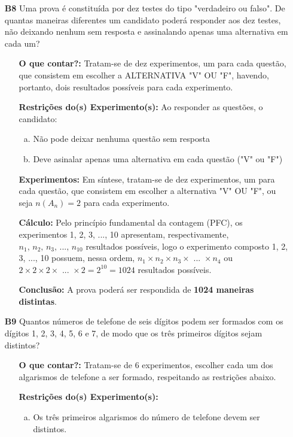 \documentclass[a4paper,12pt]{article}
\begin{document}
\begin{enumerate}
\item[\textbf{B8}] Uma prova é constituída por dez testes do tipo "verdadeiro ou falso". De quantas maneiras diferentes um candidato poderá responder aos dez testes, não deixando nenhum sem resposta e assinalando apenas uma alternativa em cada um?
  \begin{itemize}
    \item[\ding{172}] \textbf{O que contar?:} Tratam-se de dez experimentos, um para cada questão, que consistem em escolher a ALTERNATIVA "V" OU "F", havendo, portanto, dois resultados possíveis para cada experimento.
    \item[\ding{173}] \textbf{Restrições do(s) Experimento(s):} Ao responder as questões, o candidato:
        \begin{enumerate}[a)]
          \item Não pode deixar nenhuma questão sem resposta
          \item Deve asinalar apenas uma alternativa em cada questão ("V" ou "F")
        \end{enumerate}     
    \item[\ding{174}] \textbf{Experimentos:} Em síntese, tratam-se de dez experimentos, um para cada questão, que consistem em escolher a alternativa "V" OU "F", ou seja $n(A_n) = 2$ para cada experimento.
    \item[\ding{175}] \textbf{Cálculo:} Pelo princípio fundamental da contagem (PFC), os experimentos 1, 2, 3, ..., 10 apresentam, respectivamente, $n_{1},\, n_{2},\, n_{3} \textrm{, ..., } n_{10}$ resultados possíveis, logo o experimento composto 1, 2, 3, ..., 10 possuem, nessa ordem, $n_{1} \times n_{2} \times n_{3} \times \textrm{ ... } \times n_{4}$ ou $2 \times 2 \times 2  \times \textrm{ ... }  \times 2 = 2^{10} = 1024$ resultados possíveis. 
    \item[\ding{176}] \textbf{Conclusão:} A prova poderá ser respondida de \textbf{1024 maneiras distintas}.  
  \end{itemize}

\item[\textbf{B9}] Quantos números de telefone de seis dígitos podem ser formados com os dígitos 1, 2, 3, 4, 5, 6 e 7, de modo que os três primeiros dígitos sejam distintos?
  \begin{itemize}
    \item[\ding{172}] \textbf{O que contar?:} Tratam-se de 6 experimentos, escolher cada um dos algarismos de telefone a ser formado, respeitando as restrições abaixo.
    \item[\ding{173}] \textbf{Restrições do(s) Experimento(s):}
        \begin{enumerate}[a)]
          \item Os três primeiros algarismos do número de telefone devem ser distintos.
        \end{enumerate}     


\end{itemize}
\end{enumerate}
\end{document}
